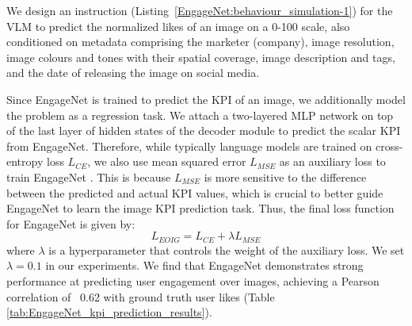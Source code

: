 We design an instruction (Listing~\ref{EngageNet:behaviour_simulation-1}) for the VLM to predict the normalized likes of an image on a 0-100 scale, also conditioned on metadata comprising the marketer (company), image resolution, image colours and tones with their spatial coverage, image description and tags, and the date of releasing the image on social media. 


Since EngageNet is trained to predict the KPI of an image, we additionally model the problem as a regression task. We attach a two-layered MLP network on top of the last layer of hidden states of the decoder module to predict the scalar KPI from EngageNet. Therefore, while typically language models are trained on cross-entropy loss $L_{CE}$, we also use mean squared error $L_{MSE}$ as an auxiliary loss to train EngageNet%
 . This is because $L_{MSE}$ is more sensitive to the difference between the predicted and actual KPI values, which is crucial to better guide EngageNet to learn the image KPI prediction task. Thus, the final loss function for EngageNet is given by:
 \begin{equation}
     L_{EOIG} = L_{CE} + \lambda L_{MSE}
 \end{equation}
 where $\lambda$ is a hyperparameter that controls the weight of the auxiliary loss. We set $\lambda = 0.1$ in our experiments. We find that EngageNet demonstrates strong performance at predicting user engagement over images, achieving a Pearson correlation of ~0.62 with ground truth user likes (Table \ref{tab:EngageNet_kpi_prediction_results}).



 
 
